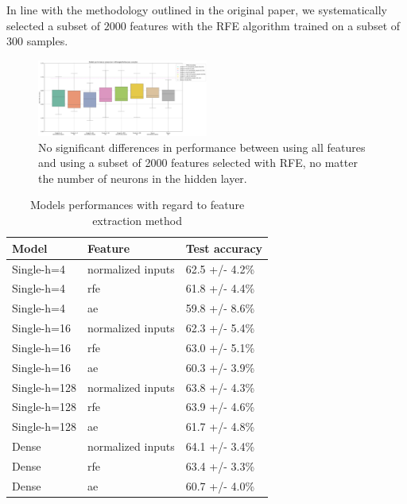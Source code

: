 In line with the methodology outlined in the original paper, we systematically selected a subset of $2000$ features with the RFE algorithm trained on a subset of 300 samples.

\begin{figure}[h!]
    \centering
    \includegraphics[width=0.5\textwidth]{figures/performances_fully_connected_RFE.png}
    \caption{No significant differences in performance between using all features and using a subset of 2000 features selected with RFE, no matter the number of neurons in the hidden layer.}
    \Description{}
    \label{fig:results_feature_reduction}
\end{figure}

\begin{table}[h!]
	\begin{center}
        \begin{tabular}{lll}
            Model & Feature & Test accuracy \\
            \hline
            Single-h=4 & normalized inputs & 62.5 +/- 4.2\% \\
            Single-h=4 & rfe & 61.8 +/- 4.4\% \\
            Single-h=4 & ae & 59.8 +/- 8.6\% \\
            Single-h=16 & normalized inputs & 62.3 +/- 5.4\% \\
            Single-h=16 & rfe & 63.0 +/- 5.1\% \\
            Single-h=16 & ae & 60.3 +/- 3.9\% \\
            Single-h=128 & normalized inputs & 63.8 +/- 4.3\% \\
            Single-h=128 & rfe & 63.9 +/- 4.6\% \\
            Single-h=128 & ae & 61.7 +/- 4.8\% \\
            Dense & normalized inputs & 64.1 +/- 3.4\% \\
            Dense & rfe & 63.4 +/- 3.3\% \\
            Dense & ae & 60.7 +/- 4.0\% \\
        \end{tabular}
    \end{center}
    \caption{Models performances with regard to feature extraction method}
    \label{table:dependance_on_feature_extraction_method}
\end{table}

